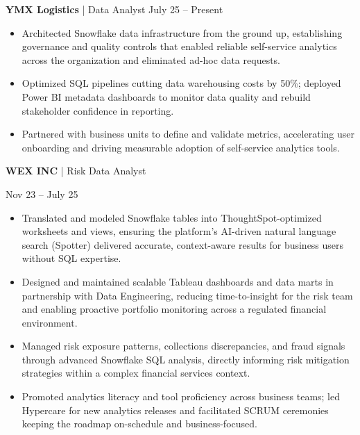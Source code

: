 \documentclass[9pt, letterpaper]{article}
\begin{document}
	\noindent \textbf{YMX Logistics} | Data Analyst \hfill July 25 -- Present
	\begin{itemize}[noitemsep, topsep=1pt, leftmargin=1.5em, rightmargin=0.5cm]
		\item Architected Snowflake data infrastructure from the ground up, establishing governance and quality controls that enabled reliable self-service analytics across the organization and eliminated ad-hoc data requests.
		\item Optimized SQL pipelines cutting data warehousing costs by 50\%; deployed Power BI metadata dashboards to monitor data quality and rebuild stakeholder confidence in reporting.
		\item Partnered with business units to define and validate metrics, accelerating user onboarding and driving measurable adoption of self-service analytics tools.
	\end{itemize}

	\noindent \begin{minipage}[t]{0.75\textwidth}
		\textbf{WEX INC} | Risk Data Analyst
	\end{minipage}
	\begin{minipage}[t]{0.25\textwidth}
		\raggedleft Nov 23 -- July 25
	\end{minipage}

	\begin{itemize}[noitemsep, topsep=1pt, leftmargin=1.5em, rightmargin=0.5cm]
		\item Translated and modeled Snowflake tables into ThoughtSpot-optimized worksheets and views, ensuring the platform's AI-driven natural language search (Spotter) delivered accurate, context-aware results for business users without SQL expertise.
		\item Designed and maintained scalable Tableau dashboards and data marts in partnership with Data Engineering, reducing time-to-insight for the risk team and enabling proactive portfolio monitoring across a regulated financial environment.
		\item Managed risk exposure patterns, collections discrepancies, and fraud signals through advanced Snowflake SQL analysis, directly informing risk mitigation strategies within a complex financial services context.
		\item Promoted analytics literacy and tool proficiency across business teams; led Hypercare for new analytics releases and facilitated SCRUM ceremonies keeping the roadmap on-schedule and business-focused.
	\end{itemize}
\end{document}
